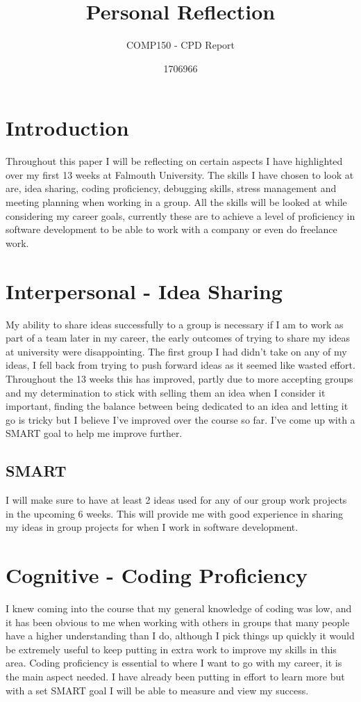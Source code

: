 \documentclass{scrartcl}
\title{Personal Reflection}
\subtitle{COMP150 - CPD Report}
\author{1706966}
\begin{document}
\maketitle

\section{Introduction}

Throughout this paper I will be reflecting on certain aspects I have highlighted over my first 13 weeks at Falmouth University. The skills I have chosen to look at are, idea sharing, coding proficiency, debugging skills, stress management and meeting planning when working in a group. All the skills will be looked at while considering my career goals, currently these are to achieve a level of proficiency in software development to be able to work with a company or even do freelance work.

\section{Interpersonal - Idea Sharing}

My ability to share ideas successfully to a group is necessary if I am to work as part of a team later in my career, the early outcomes of trying to share my ideas at university were disappointing. The first group I had didn't take on any of my ideas, I fell back from trying to push forward ideas as it seemed like wasted effort. Throughout the 13 weeks this has improved, partly due to more accepting groups and my determination to stick with selling them an idea when I consider it important, finding the balance between being dedicated to an idea and letting it go is tricky but I believe I’ve improved over the course so far. I've come up with a SMART goal to help me improve further.
\subsection{SMART}
I will make sure to have at least 2 ideas used for any of our group work projects in the upcoming 6 weeks. This will provide me with good experience in sharing my ideas in group projects for when I work in software development.


\section{Cognitive - Coding Proficiency}
I knew coming into the course that my general knowledge of coding was low, and it has been obvious to me when working with others in groups that many people have a higher understanding than I do, although I pick things up quickly it would be extremely useful to keep putting in extra work to improve my skills in this area. Coding proficiency is essential to where I want to go with my career, it is the main aspect needed. I have already been putting in effort to learn more but with a set SMART goal I will be able to measure and view my success. 
\end{document}
